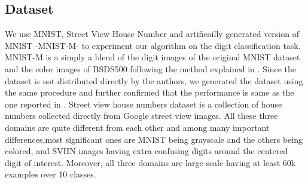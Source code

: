 \begin{table}[ht]
\vspace{-2mm}
\caption{Accuracy on the digit classification task.}
\label{tab:res2}
\begin{sc}
\begin{small}
\end{small}
\end{sc}
\vspace{-7mm}
\end{table}

\vspace{-2mm}
\subsection{Dataset}
We use MNIST\cite{mnist}, Street View House Number\cite{svhn} and artificailly generated version of MNIST -MNIST-M- \cite{ganin15} to experiment our algorithm on the digit classification task. MNIST-M is a simply a blend of the digit images of the original MNIST dataset and the color images of BSDS500\cite{bsds500} following the method explained in \cite{ganin15}. Since the dataset is not distributed directly by the authors, we generated the dataset using the same procedure and further confirmed that the performance is same as the one reported in \cite{ganin15}. Street view house numbers dataset is a collection of house numbers collected directly from Google street view images. All these three domains are quite different from each other and among many important differences,most significant ones are MNIST being grayscale and the others being colored, and SVHN images having extra confusing digits around the centered digit of interest. Moreover, all three domains are large-scale having at least 60k examples over 10 classes. 

